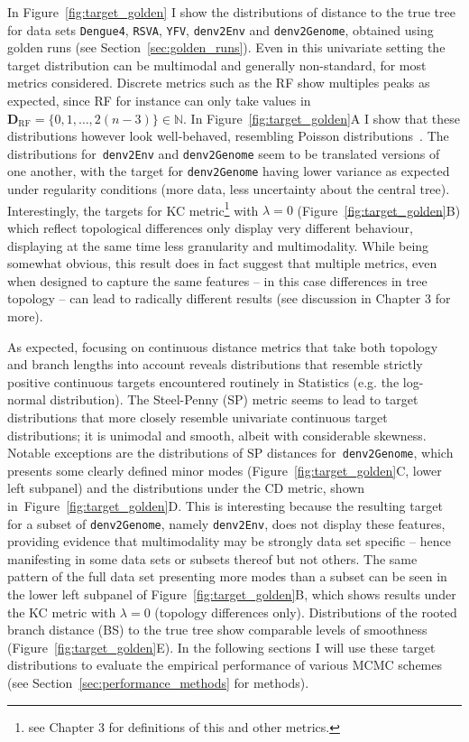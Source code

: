 In Figure~\ref{fig:target_golden} I show the distributions of distance to the true tree for data sets \verb|Dengue4|, \verb|RSVA|, \verb|YFV|, \verb|denv2Env| and \verb|denv2Genome|, obtained using golden runs (see Section~\ref{sec:golden_runs}).
Even in this univariate setting the target distribution can be multimodal and generally non-standard, for most metrics considered.
Discrete metrics such as the RF show multiples peaks as expected, since RF for instance can only take values in $\boldsymbol D_{\text{RF}} = \{0, 1, \ldots, 2(n-3) \} \in \mathbb{N} $.
In Figure~\ref{fig:target_golden}A I show that these distributions however look well-behaved, resembling Poisson distributions~\citep{Bryant2009}.
The distributions for~\verb|denv2Env| and \verb|denv2Genome| seem to be translated versions of one another, with the target for \verb|denv2Genome| having lower variance as expected under regularity conditions (more data, less uncertainty about the central tree). 
Interestingly, the targets for KC metric\footnote{see Chapter 3 for definitions of this and other metrics.} with $\lambda = 0$ (Figure~\ref{fig:target_golden}B)  which reflect topological differences only display very different behaviour, displaying at the same time less granularity and multimodality.
While being somewhat obvious, this result does in fact suggest that multiple metrics, even when designed to capture the same features -- in this case differences in tree topology -- can lead to radically different results (see discussion in Chapter 3 for more).

As expected, focusing on continuous distance metrics that take both topology and branch lengths into account reveals distributions that resemble strictly positive continuous targets encountered routinely in Statistics (e.g. the log-normal distribution).
The Steel-Penny (SP) metric seems to lead to target distributions that more closely resemble univariate continuous target distributions; it is unimodal and smooth, albeit with considerable skewness.
Notable exceptions are the distributions of SP distances for~\verb|denv2Genome|, which presents some clearly defined minor modes (Figure~\ref{fig:target_golden}C, lower left subpanel) and the distributions under the CD metric, shown in~Figure~\ref{fig:target_golden}D.
This is interesting  because the resulting target for a subset of \verb|denv2Genome|, namely \verb|denv2Env|, does not display these features, providing evidence that multimodality may be strongly data set specific -- hence manifesting in some data sets or subsets thereof but not others.
The same pattern of the full data set presenting more modes than a subset can be seen in the lower left subpanel of Figure~\ref{fig:target_golden}B, which shows results under the KC metric with $\lambda = 0$  (topology differences only).
Distributions of the rooted branch distance (BS) to the true tree show comparable levels of smoothness (Figure~\ref{fig:target_golden}E).
In the following sections I will use these target distributions to evaluate the empirical performance of various MCMC schemes (see Section~\ref{sec:performance_methods} for methods).

